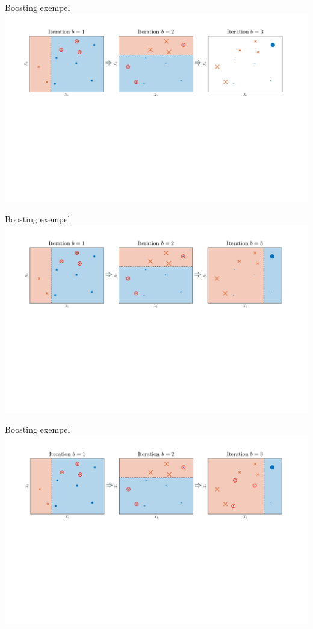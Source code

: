 \documentclass[10pt,english]{beamer}
\begin{document}
\begin{frame}{Boosting exempel}
    \includegraphics[width=\textwidth]{figs/Boosting illustration7.png}
\end{frame}

\begin{frame}{Boosting exempel}
    \includegraphics[width=\textwidth]{figs/Boosting illustration8.png}
\end{frame}

\begin{frame}{Boosting exempel}
    \includegraphics[width=\textwidth]{figs/Boosting illustration9.png}
\end{frame}
\end{document}

